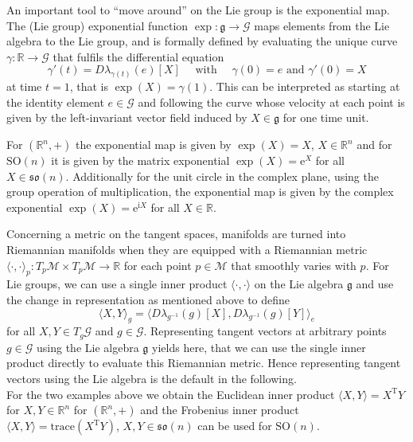 \documentclass{juliacon}
\newcommand{\e}{\ensuremath{\mathrm{e}}}
\newcommand{\im}{\ensuremath{\mathrm{i}}}
\begin{document}
An important tool to “move around” on the Lie group is the exponential map.
The (Lie group) exponential function \(\exp\colon \mathfrak{g} \to \mathcal{G}\) maps elements from the Lie algebra to the Lie group, and is formally defined \cite[Def.~9.2.2]{HilgertNeeb:2012} by evaluating the unique curve \(\gamma\colon \mathbb{R} \to \mathcal{G}\) that fulfils the differential equation
\begin{equation*}
\gamma'(t) = D\lambda_{\gamma(t)}(e)[X]
\quad\text{ with }\quad\gamma(0) = e \text{ and }\gamma'(0) = X
\end{equation*}
at time $t=1$, that is \(\exp(X) = \gamma(1)\).
This can be interpreted as starting at the identity element \(e \in \mathcal{G}\) and following the curve whose velocity at each point is given by the left-invariant vector field induced by \(X \in \mathfrak{g}\) for one time unit.

For \((\mathbb{R}^n, +)\) the exponential map is given by \(\exp(X) = X\), $X\in \mathbb R^n$ and for \(\mathrm{SO}(n)\) it is given by the matrix exponential \(\exp(X) = \e^{X}\) for all \(X \in \mathfrak{so}(n)\).
Additionally for the unit circle in the complex plane, using the group operation of multiplication, the exponential map is given by the complex exponential \(\exp(X) = \e^{\im X}\) for all \(X \in \mathbb{R}\).

Concerning a metric on the tangent spaces, manifolds are turned into Riemannian manifolds when they are equipped with a Riemannian metric \(\langle \cdot, \cdot \rangle_p\colon T_p\mathcal{M} \times T_p\mathcal{M} \to \mathbb{R}\) for each point \(p \in \mathcal{M}\) that smoothly varies with \(p\).
For Lie groups, we can use a single inner product \(\langle \cdot, \cdot \rangle\) on the Lie algebra \(\mathfrak{g}\) and use the change in representation as mentioned above to define
\begin{equation*}
\langle X, Y \rangle_g = \langle D\lambda_{g^{-1}}(g)[X], D\lambda_{g^{-1}}(g)[Y] \rangle_e
\end{equation*}
for all \(X, Y \in T_g\mathcal{G}\) and \(g \in \mathcal{G}\). Representing tangent vectors at arbitrary points \(g \in \mathcal{G}\) using the Lie algebra \(\mathfrak{g}\) yields here, that we can use the single inner product directly to evaluate this Riemannian metric. Hence representing tangent vectors using the Lie algebra is the default in the following.
\\
For the two examples above we obtain the Euclidean inner product \(\langle X, Y \rangle = X^{\mathrm{T}} Y\) for \(X, Y \in \mathbb{R}^n\) for \((\mathbb{R}^n, +)\) and the Frobenius inner product \(\langle X, Y \rangle = \mathrm{trace}(X^{\mathrm{T}} Y)\), \(X, Y \in \mathfrak{so}(n)\) can be used for \(\mathrm{SO}(n)\).
\end{document}

